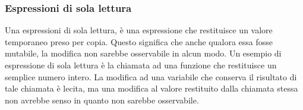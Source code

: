 \subsubsection{Espressioni di sola lettura}
Una espressioni di sola lettura, è una espressione che restituisce un valore temporaneo preso per copia. Questo 
significa che anche qualora essa fosse mutabile, la modifica non sarebbe osservabile in alcun modo. Un esempio di 
espressione di sola lettura è la chiamata ad una funzione che restituisce un semplice numero intero. La modifica ad una variabile 
che conserva il risultato di tale chiamata è lecita, ma una modifica al valore restituito dalla chiamata stessa non avrebbe senso 
in quanto non sarebbe osservabile.